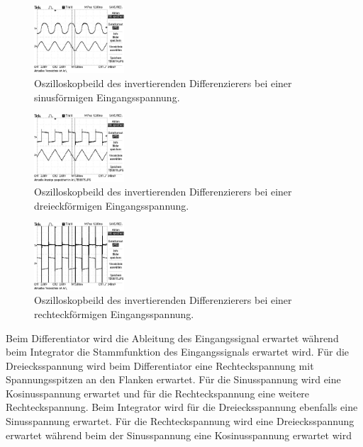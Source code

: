   \begin{figure}
    \centering
    \includegraphics[width=0.3\textwidth,angle=90]{content/grafiken/invertierenderDifferenzierer/TEK0014.JPG}
    \caption{Oszilloskopbeild des invertierenden Differenzierers bei einer sinusförmigen Eingangsspannung.}
    \label{fig:sinusII}
  \end{figure}
  \begin{figure}
    \centering
    \includegraphics[width=0.3\textwidth,angle=90]{content/grafiken/invertierenderDifferenzierer/TEK0016.JPG}
    \caption{Oszilloskopbeild des invertierenden Differenzierers bei einer dreieckförmigen Eingangsspannung.}
    \label{fig:dreieckII}
  \end{figure}
  \begin{figure}
    \centering
    \includegraphics[width=0.3\textwidth,angle=90]{content/grafiken/invertierenderDifferenzierer/TEK0015.JPG}
    \caption{Oszilloskopbeild des invertierenden Differenzierers bei einer rechteckförmigen Eingangsspannung.}
    \label{fig:rechteckII}
  \end{figure}
  Beim Differentiator wird die Ableitung des Eingangssignal erwartet während beim Integrator die Stammfunktion 
  des Eingangssignals erwartet wird. Für die Dreiecksspannung
  wird beim Differentiator eine Rechteckspannung mit Spannungsspitzen an den Flanken
  erwartet. Für die Sinusspannung wird eine Kosinusspannung erwartet und für die Rechteckspannung eine weitere Rechteckspannung.
  Beim Integrator wird für die Dreiecksspannung ebenfalls eine Sinusspannung erwartet.
  Für die Rechteckspannung wird eine Dreiecksspannung erwartet während beim der Sinusspannung eine Kosinusspannung erwartet wird



